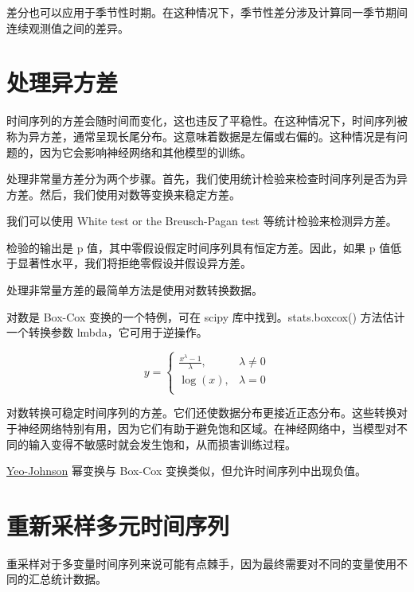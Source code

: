 差分也可以应用于季节性时期。在这种情况下，季节性差分涉及计算同一季节期间连续观测值之间的差异。

\section{处理异方差}
时间序列的方差会随时间而变化，这也违反了平稳性。在这种情况下，时间序列被称为异方差，通常呈现长尾分布。这意味着数据是左偏或右偏的。这种情况是有问题的，因为它会影响神经网络和其他模型的训练。

处理非常量方差分为两个步骤。首先，我们使用统计检验来检查时间序列是否为异方差。然后，我们使用对数等变换来稳定方差。

我们可以使用 White test or the Breusch-Pagan test 等统计检验来检测异方差。

检验的输出是 p 值，其中零假设假定时间序列具有恒定方差。因此，如果 p 值低于显著性水平，我们将拒绝零假设并假设异方差。

处理非常量方差的最简单方法是使用对数转换数据。

对数是 Box-Cox 变换的一个特例，可在 scipy 库中找到。stats.boxcox() 方法估计一个转换参数 lmbda，它可用于逆操作。

\begin{equation}
    y=\begin{cases}
        \frac{x^\lambda-1}{\lambda}, & \lambda \neq 0 \\
        \log(x) ,                    & \lambda=0      \\
    \end{cases}
\end{equation}

对数转换可稳定时间序列的方差。它们还使数据分布更接近正态分布。这些转换对于神经网络特别有用，因为它们有助于避免饱和区域。在神经网络中，当模型对不同的输入变得不敏感时就会发生饱和，从而损害训练过程。

\href{https://docs.scipy.org/doc/scipy/reference/generated/scipy.stats.yeojohnson.html}{Yeo-Johnson} 幂变换与 Box-Cox 变换类似，但允许时间序列中出现负值。
\section{重新采样多元时间序列}
重采样对于多变量时间序列来说可能有点棘手，因为最终需要对不同的变量使用不同的汇总统计数据。